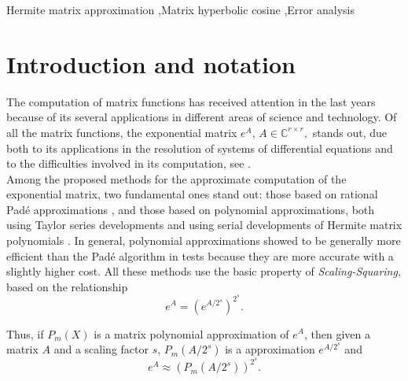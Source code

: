 \documentclass[preprint,10pt]{elsarticle}
\begin{document}
\begin{frontmatter}

\begin{abstract}
\noindent

\end{abstract}

\begin{keyword}


 Hermite matrix approximation \sep Matrix hyperbolic cosine \sep Error analysis
\end{keyword}

\end{frontmatter}



\section{Introduction and notation}
The computation of matrix functions has received attention in the last years because of its several applications in different areas of science and technology. Of all the matrix functions, the exponential matrix $e^A$, $A \in \mathbb{C}^{r \times r},$ stands out, due both to its applications in the resolution of systems of differential equations and to the difficulties involved in its computation, see \cite{Vanl75,MoVa78,MoVa03,High08}.\\

Among the proposed methods for the approximate computation of the exponential matrix, two fundamental ones stand out: those based on rational Pad\'e approximations \cite{BaGr96,DiPa00,AlHi09,High04}, and those based on polynomial approximations, both using Taylor series developments  \cite{sastre2015new,SIDR11,RSID16,sastre2019boosting} and using serial developments of Hermite matrix polynomials  \cite{defez1998some,sastre2011efficient}. In general, polynomial approximations showed to be generally more efficient than the Pad\'e algorithm in tests because they are more accurate with a slightly higher cost. All these methods use the basic property of \emph{Scaling-Squaring}, based on the relationship
$$
e^{A}=\left(e^{A/2^s} \right)^{2^s}.
$$

Thus, if ${P_m}(X)$ is a matrix polynomial  approximation of $e^A$, then given a matrix $A$ and a scaling factor $s$,   $P_m(A/2^s)$ is a approximation  $e^{A/2^s}$ and
\begin{equation}
\label{Eq_scaling}
e^{A}\approx \left(P_m(A/2^s) \right)^{2^s}.
\end{equation}
\end{document}
